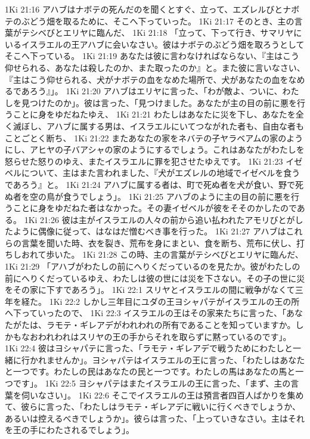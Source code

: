 1Ki 21:16  アハブはナボテの死んだのを聞くとすぐ、立って、エズレルびとナボテのぶどう畑を取るために、そこへ下っていった。
1Ki 21:17  そのとき、主の言葉がテシベびとエリヤに臨んだ、
1Ki 21:18  「立って、下って行き、サマリヤにいるイスラエルの王アハブに会いなさい。彼はナボテのぶどう畑を取ろうとしてそこへ下っている。
1Ki 21:19  あなたは彼に言わなければならない、『主はこう仰せられる、あなたは殺したのか、また取ったのか』と。また彼に言いなさい、『主はこう仰せられる、犬がナボテの血をなめた場所で、犬があなたの血をなめるであろう』」。
1Ki 21:20  アハブはエリヤに言った、「わが敵よ、ついに、わたしを見つけたのか」。彼は言った、「見つけました。あなたが主の目の前に悪を行うことに身をゆだねたゆえ、
1Ki 21:21  わたしはあなたに災を下し、あなたを全く滅ぼし、アハブに属する男は、イスラエルにいてつながれた者も、自由な者もことごとく断ち、
1Ki 21:22  またあなたの家をネバテの子ヤラベアムの家のようにし、アヒヤの子バアシャの家のようにするでしょう。これはあなたがわたしを怒らせた怒りのゆえ、またイスラエルに罪を犯させたゆえです。
1Ki 21:23  イゼベルについて、主はまた言われました、『犬がエズレルの地域でイゼベルを食うであろう』と。
1Ki 21:24  アハブに属する者は、町で死ぬ者を犬が食い、野で死ぬ者を空の鳥が食うでしょう」。
1Ki 21:25  アハブのように主の目の前に悪を行うことに身をゆだねた者はなかった。その妻イゼベルが彼をそそのかしたのである。
1Ki 21:26  彼は主がイスラエルの人々の前から追い払われたアモリびとがしたように偶像に従って、はなはだ憎むべき事を行った。
1Ki 21:27  アハブはこれらの言葉を聞いた時、衣を裂き、荒布を身にまとい、食を断ち、荒布に伏し、打ちしおれて歩いた。
1Ki 21:28  この時、主の言葉がテシベびとエリヤに臨んだ、
1Ki 21:29  「アハブがわたしの前にへりくだっているのを見たか。彼がわたしの前にへりくだっているゆえ、わたしは彼の世には災を下さない。その子の世に災をその家に下すであろう」。
1Ki 22:1  スリヤとイスラエルの間に戦争がなくて三年を経た。
1Ki 22:2  しかし三年目にユダの王ヨシャパテがイスラエルの王の所へ下っていったので、
1Ki 22:3  イスラエルの王はその家来たちに言った、「あなたがたは、ラモテ・ギレアデがわれわれの所有であることを知っていますか。しかもなおわれわれはスリヤの王の手からそれを取らずに黙っているのです」。
1Ki 22:4  彼はヨシャパテに言った、「ラモテ・ギレアデで戦うためにわたしと一緒に行かれませんか」。ヨシャパテはイスラエルの王に言った、「わたしはあなたと一つです。わたしの民はあなたの民と一つです。わたしの馬はあなたの馬と一つです」。
1Ki 22:5  ヨシャパテはまたイスラエルの王に言った、「まず、主の言葉を伺いなさい」。
1Ki 22:6  そこでイスラエルの王は預言者四百人ばかりを集めて、彼らに言った、「わたしはラモテ・ギレアデに戦いに行くべきでしょうか、あるいは控えるべきでしょうか」。彼らは言った、「上っていきなさい。主はそれを王の手にわたされるでしょう」。
